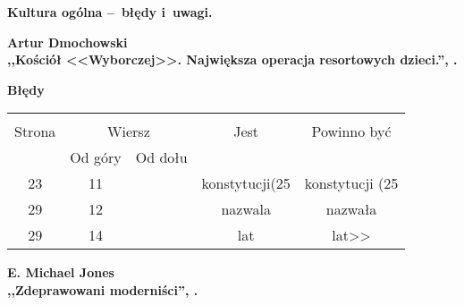 \documentclass[a4paper]{article}
\newcommand{\spaceOne}{2em}
\newcommand{\spaceTwo}{1em}
\newcommand{\tb}{\textbf}
\newcommand{\Center}[1]{\begin{center} #1 \end{center}}
\newcommand{\CenterTB}[1]{\Center{\tb{#1}}}
\newcommand{\Work}[1]{ \begin{center} {\large \tb{#1}} \end{center} }
\newcommand{\Main}[1]{ \begin{center} {\LARGE \tb{#1} } \end{center} }
\begin{document}
\Main{Kultura ogólna --~błędy i~uwagi.}

\vspace{\spaceTwo}





\Work{
  Artur Dmochowski \\
  ,,Kościół <<Wyborczej>>. Największa operacja resortowych dzieci.'',
  \cite{Dmo14}.}


\CenterTB{Błędy}
\begin{center}
  \begin{tabular}{|c|c|c|c|c|}
    \hline
    & \multicolumn{2}{c|}{} & & \\
    Strona & \multicolumn{2}{c|}{Wiersz}& Jest & Powinno być \\ \cline{2-3}
    & Od góry & Od dołu &  &  \\ \hline
    23 & 11 & & konstytucji(25 & konstytucji (25 \\
    29 & 12 & & nazwala & nazwała \\
    29 & 14 & & lat & lat>> \\ \hline
  \end{tabular}
\end{center}

\vspace{\spaceOne}



\newpage





\Work{
  E. Michael Jones \\
  ,,Zdeprawowani moderniści'', \cite{MJ14}.}
\end{document}
